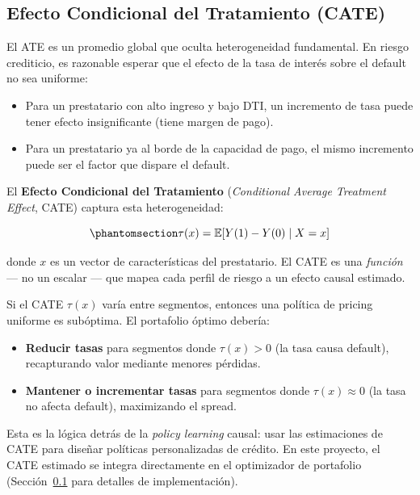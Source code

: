 \documentclass[
  spanish,
  11pt,
  letterpaper,
]{scrbook}
\providecommand{\tightlist}{%
  \setlength{\itemsep}{0pt}\setlength{\parskip}{0pt}}
\theoremstyle{plain}
\theoremstyle{remark}
\begin{document}
\subsection{Efecto Condicional del Tratamiento (CATE)}\label{sec-cate}

El ATE es un promedio global que oculta heterogeneidad fundamental. En
riesgo crediticio, es razonable esperar que el efecto de la tasa de
interés sobre el default no sea uniforme:

\begin{itemize}
\tightlist
\item
  Para un prestatario con alto ingreso y bajo DTI, un incremento de tasa
  puede tener efecto insignificante (tiene margen de pago).
\item
  Para un prestatario ya al borde de la capacidad de pago, el mismo
  incremento puede ser el factor que dispare el default.
\end{itemize}

El \textbf{Efecto Condicional del Tratamiento} (\emph{Conditional
Average Treatment Effect}, CATE) captura esta heterogeneidad:

\begin{equation}\protect\phantomsection\label{eq-cate}{
\tau(x) = \mathbb{E}[Y(1) - Y(0) \mid X = x]
}\end{equation}

donde \(x\) es un vector de características del prestatario. El CATE es
una \emph{función} --- no un escalar --- que mapea cada perfil de riesgo
a un efecto causal estimado.

\begin{tcolorbox}[enhanced jigsaw, arc=.35mm, bottomrule=.15mm, bottomtitle=1mm, breakable, colback=white, colbacktitle=quarto-callout-note-color!10!white, colframe=quarto-callout-note-color-frame, coltitle=black, left=2mm, leftrule=.75mm, opacityback=0, opacitybacktitle=0.6, rightrule=.15mm, title=\textcolor{quarto-callout-note-color}{\faInfo}\hspace{0.5em}{¿Por qué el CATE es central para la optimización de portafolio?}, titlerule=0mm, toprule=.15mm, toptitle=1mm]

Si el CATE \(\tau(x)\) varía entre segmentos, entonces una política de
pricing uniforme es subóptima. El portafolio óptimo debería:

\begin{itemize}
\tightlist
\item
  \textbf{Reducir tasas} para segmentos donde \(\tau(x) > 0\) (la tasa
  causa default), recapturando valor mediante menores pérdidas.
\item
  \textbf{Mantener o incrementar tasas} para segmentos donde
  \(\tau(x) \approx 0\) (la tasa no afecta default), maximizando el
  spread.
\end{itemize}

Esta es la lógica detrás de la \emph{policy learning} causal: usar las
estimaciones de CATE para diseñar políticas personalizadas de crédito.
En este proyecto, el CATE estimado se integra directamente en el
optimizador de portafolio (Sección~\ref{sec-cate} para detalles de
implementación).

\end{tcolorbox}
\end{document}
